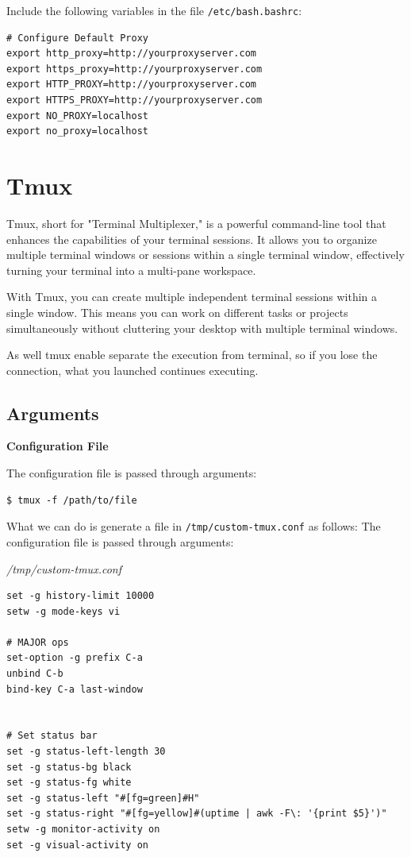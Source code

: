 \documentclass{article}
\newenvironment{codetemplate}[1][]{%
  \mybasecolorbox[#1]
  \itshape
}{%
  \endmybasecolorbox
}
\begin{document}
Include the following variables in the file \verb|/etc/bash.bashrc|:\begin{codetemplate}{}
\begin{verbatim}
# Configure Default Proxy
export http_proxy=http://yourproxyserver.com
export https_proxy=http://yourproxyserver.com
export HTTP_PROXY=http://yourproxyserver.com
export HTTPS_PROXY=http://yourproxyserver.com
export NO_PROXY=localhost
export no_proxy=localhost
\end{verbatim}
\end{codetemplate}

\newpage
\section{Tmux}

Tmux, short for "Terminal Multiplexer," is a powerful command-line tool that enhances the capabilities of your terminal sessions. It allows you to organize multiple terminal windows or sessions within a single terminal window, effectively turning your terminal into a multi-pane workspace.

With Tmux, you can create multiple independent terminal sessions within a single window. This means you can work on different tasks or projects simultaneously without cluttering your desktop with multiple terminal windows.

As well tmux enable separate the execution from terminal, so if you lose the connection, what you launched continues executing.

\subsection{Arguments}

\textbf{Configuration File}

The configuration file is passed through arguments:
\begin{codetemplate}
\begin{verbatim}
$ tmux -f /path/to/file
\end{verbatim}
\end{codetemplate}

What we can do is generate a file in \verb|/tmp/custom-tmux.conf| as follows:
The configuration file is passed through arguments:

\begin{codetemplate}{/tmp/custom-tmux.conf}
\begin{verbatim}
set -g history-limit 10000
setw -g mode-keys vi

# MAJOR ops
set-option -g prefix C-a
unbind C-b
bind-key C-a last-window


# Set status bar
set -g status-left-length 30
set -g status-bg black
set -g status-fg white
set -g status-left "#[fg=green]#H"
set -g status-right "#[fg=yellow]#(uptime | awk -F\: '{print $5}')"
setw -g monitor-activity on
set -g visual-activity on
\end{verbatim}
\end{codetemplate}
\end{document}
